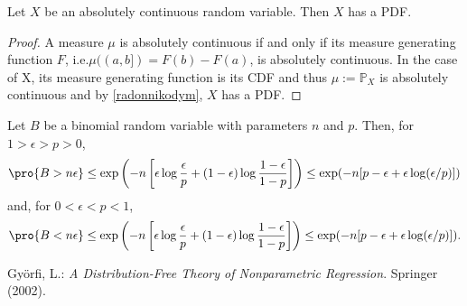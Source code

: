 \begin{corollary} \label{radonnikodymcorollary}
Let \(X\) be an absolutely continuous random variable. Then \(X\) has a PDF.
\end{corollary}

\begin{proof}
    A measure \(\mu\) is absolutely continuous if and only if its measure generating function \(F\), i.e.\@ \(\mu((a, b]) = F(b) - F(a)\), is absolutely continuous. In the case of X, its measure generating function is its CDF and thus \(\mu := \mathbb{P}_X\) is absolutely continuous and by \ref{radonnikodym}, \(X\) has a PDF.
\end{proof}

\begin{lemma} \label{chernoff}
    Let \(B\) be a binomial random variable with parameters \(n\) and \(p\). Then, for \(1 > \epsilon > p > 0\),
    \[
        \pro{B > n\epsilon}
        \leq \exp\left(-n\left[\epsilon \log \frac{\epsilon}{p} + (1 - \epsilon) \log \frac{1-\epsilon}{1 - p} \right]\right)
        \leq \exp(-n[p-\epsilon+\epsilon \log(\epsilon/p)])
    \]
    and, for \(0 < \epsilon < p < 1\),
    \[
        \pro{B < n\epsilon}
        \leq \exp\left(-n\left[\epsilon \log \frac{\epsilon}{p} + (1 - \epsilon) \log \frac{1-\epsilon}{1 - p} \right]\right)
        \leq \exp(-n[p-\epsilon+\epsilon \log(\epsilon/p)]).
    \]
\end{lemma}

\newpage


\begin{thebibliography}{1}

Györfi, L.: \emph{A Distribution-Free Theory of Nonparametric Regression}. Springer (2002).

\end{thebibliography}


